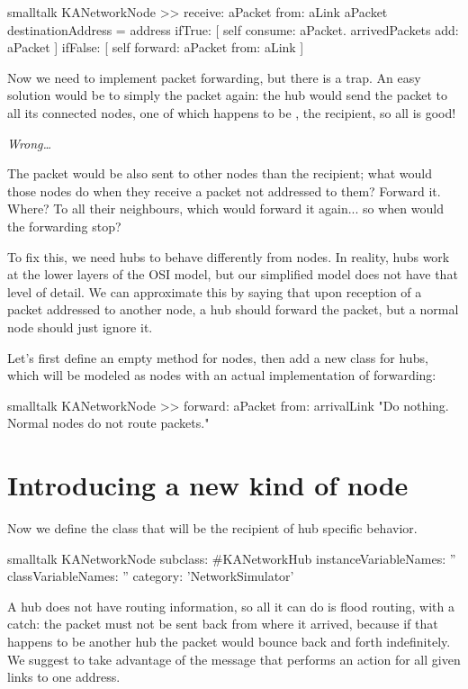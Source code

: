 \documentclass[10pt,twoside,english]{_support/latex/sbabook/sbabook}
\begin{document}
\begin{displaycode}{smalltalk}
KANetworkNode >> receive: aPacket from: aLink
    aPacket destinationAddress = address
        ifTrue: [
            self consume: aPacket.
            arrivedPackets add: aPacket ]
        ifFalse: [ self forward: aPacket from: aLink ]
\end{displaycode}

Now we need to implement packet forwarding, but there is a trap.
An easy solution would be to simply  the packet again: the hub would send the packet to all its connected nodes, one of which happens to be , the recipient, so all is good!

\textit{Wrong…}

The packet would be also sent to other nodes than the recipient; what would those nodes do when they receive a packet not addressed to them? Forward it. Where? To all their neighbours, which would forward it again... so when would the forwarding stop?

To fix this, we need hubs to behave differently from nodes.
In reality, hubs work at the lower layers of the OSI model, but our simplified model does not have that level of detail.
We can approximate this by saying that upon reception of a packet addressed to another node, a hub should forward the packet, but a normal node should just ignore it.

Let's first define an empty  method for nodes, then add a new class for hubs, which will be modeled as nodes with an actual implementation of forwarding:

\begin{displaycode}{smalltalk}
KANetworkNode >> forward: aPacket from: arrivalLink
    "Do nothing. Normal nodes do not route packets."
\end{displaycode}
\section{Introducing a new kind of node}
Now we define the class  that will be the recipient of hub specific behavior. 

\begin{displaycode}{smalltalk}
KANetworkNode subclass: #KANetworkHub
    instanceVariableNames: ''
    classVariableNames: ''
    category: 'NetworkSimulator'
\end{displaycode}

A hub does not have routing information, so all it can do is flood routing, with a catch: the packet must not be sent back from where it arrived, because if that happens to be another hub the packet would bounce back and forth indefinitely. We suggest to take advantage of the message  that performs an action for all given links to one address.
\end{document}
